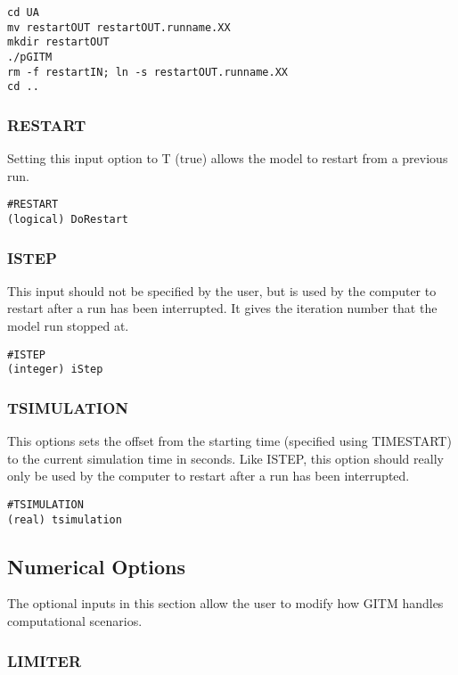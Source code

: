 \begin{verbatim}
cd UA
mv restartOUT restartOUT.runname.XX
mkdir restartOUT
./pGITM
rm -f restartIN; ln -s restartOUT.runname.XX
cd ..
\end{verbatim}

\subsubsection{RESTART}

Setting this input option to T (true) allows the model to restart from a previous run.

\begin{verbatim}
#RESTART
(logical) DoRestart
\end{verbatim}

\subsubsection{ISTEP}
\label{istep.sec}

This input should not be specified by the user, but is used by the computer to restart after a run has been interrupted.  It gives the iteration number that the model run stopped at.

\begin{verbatim}
#ISTEP
(integer) iStep
\end{verbatim}

\subsubsection{TSIMULATION}

This options sets the offset from the starting time (specified using TIMESTART) to the current simulation time in seconds.  Like ISTEP, this option should really only be used by the computer to restart after a run has been interrupted.

\begin{verbatim}
#TSIMULATION
(real) tsimulation    
\end{verbatim}


\subsection{Numerical Options}
\label{numerical.sec}

The optional inputs in this section allow the user to modify how GITM handles computational scenarios.

\subsubsection{LIMITER}
\label{limiter.sec}

